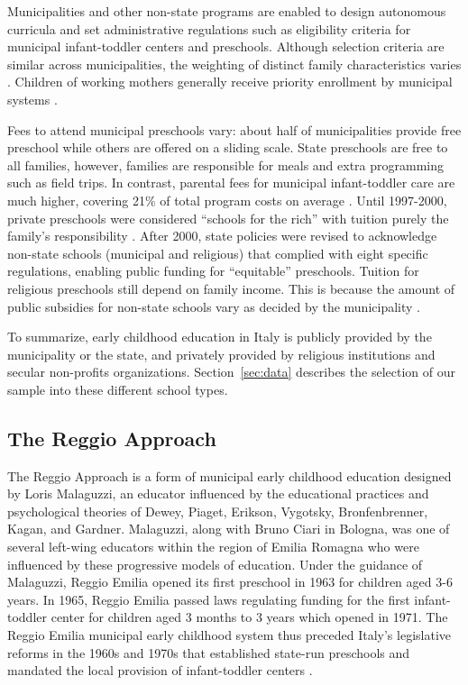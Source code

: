 Municipalities and other non-state programs are enabled to design autonomous curricula and set administrative regulations such as eligibility criteria for municipal infant-toddler centers and preschools. Although selection criteria are similar across municipalities, the weighting of distinct family characteristics varies \citep{Del-Boca-etal_2016_CESifo-ES}. Children of working mothers generally receive priority enrollment by municipal systems \citep{Saraceno_1984_Soc-Probs}.

Fees to attend municipal preschools vary: about half of municipalities provide free preschool while others are offered on a sliding scale. State preschools are free to all families, however, families are responsible for meals and extra programming such as field trips. In contrast, parental fees for municipal infant-toddler care are much higher, covering 21\% of total program costs on average \citep{Musatti-Picchio_2010_IJEC}. Until 1997-2000, private preschools were considered ``schools for the rich'' with tuition purely the family's responsibility \citep{Ribolzi_2013_Italy}. After 2000, state policies were revised to acknowledge non-state schools (municipal and religious) that complied with eight specific regulations, enabling public funding for ``equitable'' preschools. Tuition for religious preschools still depend on family income. This is because the amount of public subsidies for non-state schools vary as decided by the municipality \citep{Hohnerlein_2009_Paradox-Public-Preschools,Ribolzi_2013_Italy}.

To summarize, early childhood education in Italy is publicly provided by the municipality or the state, and privately provided by religious institutions and secular non-profits organizations. Section~\ref{sec:data} describes the selection of our sample into these different school types.

\subsection{The Reggio Approach}

The Reggio Approach is a form of municipal early childhood education designed by Loris Malaguzzi, an educator influenced by the educational practices and psychological theories of Dewey, Piaget, Erikson, Vygotsky, Bronfenbrenner, Kagan, and Gardner. Malaguzzi, along with Bruno Ciari in Bologna, was one of several left-wing educators within the region of Emilia Romagna who were influenced by these progressive models of education. Under the guidance of Malaguzzi, Reggio Emilia opened its first preschool in 1963 for children aged 3-6 years. In 1965, Reggio Emilia passed laws regulating funding for the first infant-toddler center for children aged 3 months to 3 years which opened in 1971. The Reggio Emilia municipal early childhood system thus preceded Italy's legislative reforms in the 1960s and 1970s that established state-run preschools and mandated the local provision of infant-toddler centers \citep{Cagliari-etal-eds_2016_BOOK_Loris-Malaguzzi}. 

